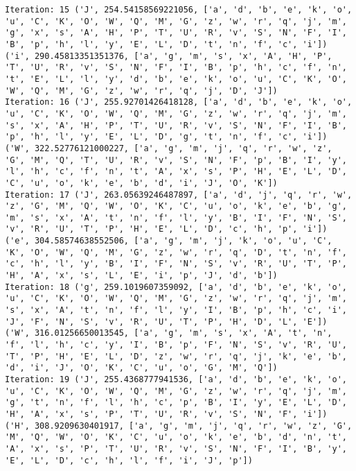 \documentclass[english,man]{apa6}
\begin{document}
\begin{verbatim}
Iteration: 15 ('J', 254.54158569221056, ['a', 'd', 'b', 'e', 'k', 'o', 'u', 'C', 'K', 'O', 'W', 'Q', 'M', 'G', 'z', 'w', 'r', 'q', 'j', 'm', 'g', 'x', 's', 'A', 'H', 'P', 'T', 'U', 'R', 'v', 'S', 'N', 'F', 'I', 'B', 'p', 'h', 'l', 'y', 'E', 'L', 'D', 't', 'n', 'f', 'c', 'i']) ('i', 290.45813351351376, ['a', 'g', 'm', 's', 'x', 'A', 'H', 'P', 'T', 'U', 'R', 'v', 'S', 'N', 'F', 'I', 'B', 'p', 'h', 'c', 'f', 'n', 't', 'E', 'L', 'l', 'y', 'd', 'b', 'e', 'k', 'o', 'u', 'C', 'K', 'O', 'W', 'Q', 'M', 'G', 'z', 'w', 'r', 'q', 'j', 'D', 'J'])
Iteration: 16 ('J', 255.92701426418128, ['a', 'd', 'b', 'e', 'k', 'o', 'u', 'C', 'K', 'O', 'W', 'Q', 'M', 'G', 'z', 'w', 'r', 'q', 'j', 'm', 's', 'x', 'A', 'H', 'P', 'T', 'U', 'R', 'v', 'S', 'N', 'F', 'I', 'B', 'p', 'h', 'l', 'y', 'E', 'L', 'D', 'g', 't', 'n', 'f', 'c', 'i']) ('W', 322.52776121000227, ['a', 'g', 'm', 'j', 'q', 'r', 'w', 'z', 'G', 'M', 'Q', 'T', 'U', 'R', 'v', 'S', 'N', 'F', 'p', 'B', 'I', 'y', 'l', 'h', 'c', 'f', 'n', 't', 'A', 'x', 's', 'P', 'H', 'E', 'L', 'D', 'C', 'u', 'o', 'k', 'e', 'b', 'd', 'i', 'J', 'O', 'K'])
Iteration: 17 ('J', 263.05639246487897, ['a', 'd', 'j', 'q', 'r', 'w', 'z', 'G', 'M', 'Q', 'W', 'O', 'K', 'C', 'u', 'o', 'k', 'e', 'b', 'g', 'm', 's', 'x', 'A', 't', 'n', 'f', 'l', 'y', 'B', 'I', 'F', 'N', 'S', 'v', 'R', 'U', 'T', 'P', 'H', 'E', 'L', 'D', 'c', 'h', 'p', 'i']) ('e', 304.58574638552506, ['a', 'g', 'm', 'j', 'k', 'o', 'u', 'C', 'K', 'O', 'W', 'Q', 'M', 'G', 'z', 'w', 'r', 'q', 'D', 't', 'n', 'f', 'c', 'h', 'l', 'y', 'B', 'I', 'F', 'N', 'S', 'v', 'R', 'U', 'T', 'P', 'H', 'A', 'x', 's', 'L', 'E', 'i', 'p', 'J', 'd', 'b'])
Iteration: 18 ('g', 259.1019607359092, ['a', 'd', 'b', 'e', 'k', 'o', 'u', 'C', 'K', 'O', 'W', 'Q', 'M', 'G', 'z', 'w', 'r', 'q', 'j', 'm', 's', 'x', 'A', 't', 'n', 'f', 'l', 'y', 'I', 'B', 'p', 'h', 'c', 'i', 'J', 'F', 'N', 'S', 'v', 'R', 'U', 'T', 'P', 'H', 'D', 'L', 'E']) ('W', 316.01256650013545, ['a', 'g', 'm', 's', 'x', 'A', 't', 'n', 'f', 'l', 'h', 'c', 'y', 'I', 'B', 'p', 'F', 'N', 'S', 'v', 'R', 'U', 'T', 'P', 'H', 'E', 'L', 'D', 'z', 'w', 'r', 'q', 'j', 'k', 'e', 'b', 'd', 'i', 'J', 'O', 'K', 'C', 'u', 'o', 'G', 'M', 'Q'])
Iteration: 19 ('J', 255.4368777941536, ['a', 'd', 'b', 'e', 'k', 'o', 'u', 'C', 'K', 'O', 'W', 'Q', 'M', 'G', 'z', 'w', 'r', 'q', 'j', 'm', 'g', 't', 'n', 'f', 'l', 'h', 'c', 'p', 'B', 'I', 'y', 'E', 'L', 'D', 'H', 'A', 'x', 's', 'P', 'T', 'U', 'R', 'v', 'S', 'N', 'F', 'i']) ('H', 308.9209630401917, ['a', 'g', 'm', 'j', 'q', 'r', 'w', 'z', 'G', 'M', 'Q', 'W', 'O', 'K', 'C', 'u', 'o', 'k', 'e', 'b', 'd', 'n', 't', 'A', 'x', 's', 'P', 'T', 'U', 'R', 'v', 'S', 'N', 'F', 'I', 'B', 'y', 'E', 'L', 'D', 'c', 'h', 'l', 'f', 'i', 'J', 'p'])

\end{verbatim}
\end{document}
